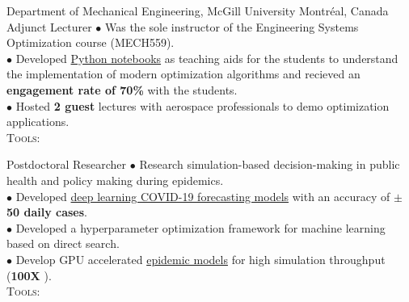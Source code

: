 \documentclass[10pt]{article} %
\begin{document}
{} %
{Department of Mechanical Engineering, McGill University} %
{Montr\'{e}al, Canada} %
{Adjunct Lecturer} %
{
	$\bullet$ Was the sole instructor of the Engineering Systems Optimization course (MECH559).\\
	$\bullet$ Developed \href{https://github.com/khbalhandawi/MECH559_notebooks/tree/master}{Python notebooks} as teaching aids for the students to understand the implementation of modern optimization algorithms and recieved an \textbf{engagement rate of 70\%} with the students.\\
	$\bullet$ Hosted \textbf{2 guest} lectures with aerospace professionals to demo optimization applications.\\
	\textsc{Tools:} ~~
} %
{}


{} %
{} %
{} %
{Postdoctoral Researcher} %
{
	$\bullet$ Research simulation-based decision-making in public health and policy making during epidemics.\\
	$\bullet$ Developed \href{https://covid-forecaster-lebanon.herokuapp.com/}{deep learning COVID-19 forecasting models} with an accuracy of \textbf{$\pm$50 daily cases}.\\
	$\bullet$ Developed a hyperparameter optimization framework for machine learning based on direct search.\\
	$\bullet$ Develop GPU accelerated \href{https://github.com/khbalhandawi/COVID_SIM_GPU}{epidemic models} for high simulation throughput (\textbf{100X }).\\
	\textsc{Tools:} ~~~~~
}
{} %

\end{document}
